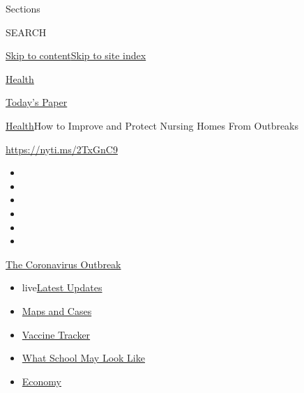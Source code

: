 Sections

SEARCH

\protect\hyperlink{site-content}{Skip to
content}\protect\hyperlink{site-index}{Skip to site index}

\href{https://www.nytimes3xbfgragh.onion/section/health}{Health}

\href{https://myaccount.nytimes3xbfgragh.onion/auth/login?response_type=cookie\&client_id=vi}{}

\href{https://www.nytimes3xbfgragh.onion/section/todayspaper}{Today's
Paper}

\href{/section/health}{Health}\textbar{}How to Improve and Protect
Nursing Homes From Outbreaks

\url{https://nyti.ms/2TxGnC9}

\begin{itemize}
\item
\item
\item
\item
\item
\item
\end{itemize}

\href{https://www.nytimes3xbfgragh.onion/news-event/coronavirus?action=click\&pgtype=Article\&state=default\&region=TOP_BANNER\&context=storylines_menu}{The
Coronavirus Outbreak}

\begin{itemize}
\tightlist
\item
  live\href{https://www.nytimes3xbfgragh.onion/2020/08/01/world/coronavirus-covid-19.html?action=click\&pgtype=Article\&state=default\&region=TOP_BANNER\&context=storylines_menu}{Latest
  Updates}
\item
  \href{https://www.nytimes3xbfgragh.onion/interactive/2020/us/coronavirus-us-cases.html?action=click\&pgtype=Article\&state=default\&region=TOP_BANNER\&context=storylines_menu}{Maps
  and Cases}
\item
  \href{https://www.nytimes3xbfgragh.onion/interactive/2020/science/coronavirus-vaccine-tracker.html?action=click\&pgtype=Article\&state=default\&region=TOP_BANNER\&context=storylines_menu}{Vaccine
  Tracker}
\item
  \href{https://www.nytimes3xbfgragh.onion/interactive/2020/07/29/us/schools-reopening-coronavirus.html?action=click\&pgtype=Article\&state=default\&region=TOP_BANNER\&context=storylines_menu}{What
  School May Look Like}
\item
  \href{https://www.nytimes3xbfgragh.onion/live/2020/07/31/business/stock-market-today-coronavirus?action=click\&pgtype=Article\&state=default\&region=TOP_BANNER\&context=storylines_menu}{Economy}
\end{itemize}

